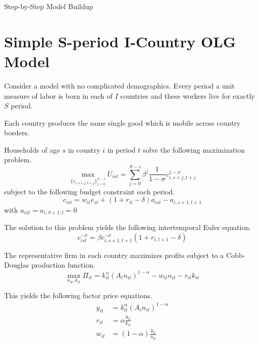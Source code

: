 \documentclass[letterpaper,12pt]{article}
\theoremstyle{definition}
\numberwithin{equation}{section}
\begin{document}
\begin{spacing}{1.5}


\LARGE{Step-by-Step Model Buildup} \normalsize

\section{Simple S-period I-Country OLG Model}
	Consider a model with no complicated demographics.  Every period a unit measure of labor is born in each of $I$ countries and these workers live for exactly $S$ period.

	Each country produces the same single good which is mobile across country borders.

	Households of age $s$ in country $i$ in period $t$ solve the following maximization problem.
	\begin{equation}
		\max_{\{c_{i,s+j,t+j}\}_{j=0}^{S-s}} U_{ist} = \sum_{j=0}^{S-s} \beta^j \frac{1}{1-\sigma} c_{i,s+j,t+j}^{1-\sigma} \nonumber
	\end{equation}
	subject to the following budget constraint each period.
	\begin{equation} \label{Eq_HHbc}
		c_{ist} = w_{it} e_{st} + (1+r_{it}-\delta)a_{ist} - a_{i,s+1,t+1}
	\end{equation}
	with $a_{i1t} = a_{i,S+1,t} = 0$

	The solution to this problem yields the following intertemporal Euler equation.
	\begin{equation} \label{Eq_HHEuler1}
		c_{ist}^{-\sigma} = \beta c_{i,s+1,t+1}^{-\sigma}(1+r_{i,t+1}-\delta)
	\end{equation}

	The representative firm in each country maximizes profits subject to a Cobb-Douglas production function.
	\begin{equation}
		\max_{n_{it},k_{it}} \Pi_{it} = k_{it}^\alpha \left( A_{i} n_{it} \right)^{1-\alpha} - w_{it}n_{it} - r_{it}k_{it} \nonumber
	\end{equation}

	This yields the following factor price equations.
	\begin{align}
		y_{it} & = k_{it}^\alpha \left( A_{i} n_{it} \right)^{1-\alpha} \\
		r_{it} & = \alpha \frac{y_{it}}{k_{it}} \\
		w_{it} & = (1-\alpha) \frac{y_{it}}{n_{it}}
	\end{align}


\end{spacing}
\end{document}

